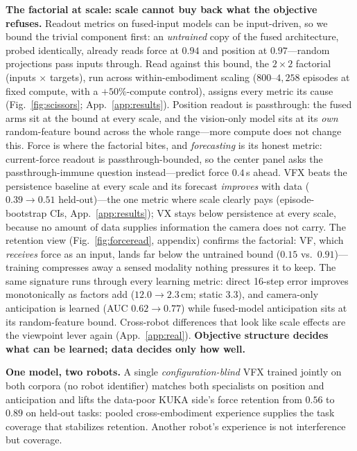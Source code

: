 \documentclass{article} %
\begin{document}
\textbf{The factorial at scale: scale cannot buy back what the objective
refuses.} Readout metrics on fused-input models can be input-driven, so we
bound the trivial component first: an \emph{untrained} copy of the fused
architecture, probed identically, already reads force at $0.94$ and position
at $0.97$---random projections pass inputs through. Read against this bound,
the $2{\times}2$ factorial (inputs $\times$ targets), run across
within-embodiment scaling ($800$--$4{,}258$ episodes at fixed compute, with
a $+50\%$-compute control), assigns every metric its cause
(Fig.~\ref{fig:scissors}; App.~\ref{app:results}). Position readout is
passthrough: the fused arms sit at the bound at every scale, and the
vision-only model sits at its \emph{own} random-feature bound across the
whole range---more compute does not change this.
Force is where the factorial bites, and \emph{forecasting} is its honest
metric: current-force readout is passthrough-bounded, so the center panel
asks the passthrough-immune question instead---predict force $0.4$\,s
ahead. VFX
beats the persistence baseline at every scale and its forecast
\emph{improves} with data ($0.39 \rightarrow 0.51$ held-out)---the one
metric where scale clearly pays (episode-bootstrap CIs,
App.~\ref{app:results}); VX stays below persistence at every scale, because
no amount of data supplies information the camera does not carry. The retention view (Fig.~\ref{fig:forceread}, appendix) confirms the
factorial: VF, which \emph{receives} force as an input, lands far below
the untrained bound ($0.15$ vs.\ $0.91$)---training compresses away a
sensed modality nothing pressures it to keep. The same signature runs through every learning metric: direct
16-step error improves monotonically as factors add ($12.0 \rightarrow
2.3$\,cm; static $3.3$), and camera-only anticipation is
learned (AUC $0.62 \rightarrow 0.77$) while fused-model anticipation sits at
its random-feature bound. Cross-robot differences that look like scale effects are the viewpoint
lever again (App.~\ref{app:real}). \textbf{Objective structure decides
what can be learned; data decides only how well.}

\textbf{One model, two robots.} A single \emph{configuration-blind} VFX
trained jointly on both corpora (no robot identifier) matches both
specialists on position and anticipation and lifts the data-poor KUKA side's
force retention from $0.56$ to $\mathbf{0.89}$ on held-out tasks: pooled
cross-embodiment experience supplies the task coverage that stabilizes
retention. Another
robot's experience is not interference but coverage.
\end{document}
